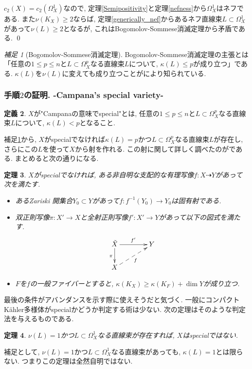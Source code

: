 \documentclass[12pt]{amsart}
\newtheorem{thm}{定理}[section]
\theoremstyle{definition}
\newtheorem{defn}[thm]{定義}
\theoremstyle{remark}
\newtheorem{rem}[thm]{補足}
\begin{document}
$c_2(X)=c_2(\Omega_{X}^1)$なので, 定理\ref{Semipositivity}と定理\ref{nefness}から$\Omega_{X}^{1}$はネフである.
また$\nu(K_X) \ge 2$ならば, 定理\ref{generically_nef}からあるネフ直線束$L \subset \Omega_{X}^{1}$があって$\nu(L)\ge 2$となるが, これはBogomolov-Sommese消滅定理から矛盾である.  \qed

\begin{rem}[Bogomolov-Sommese消滅定理]
\label{Bogomolov-Sommese}
Bogomolov-Sommese消滅定理の主張とは「任意の$1 \le p \le n$と$L \subset \Omega_{X}^{p}$なる直線束$L$について, $\kappa(L) \le p$が成り立つ」である. $\kappa(L)$を$\nu(L)$に変えても成り立つことが\cite{Mou98}により知られている.
\end{rem}

\subsubsection{手順$2$の証明. -Campana's special variety-}
\begin{defn}
$X$が"Campanaの意味でspecial"とは, 任意の$1 \le p \le n$と$L \subset \Omega_{X}^{p}$なる直線束$L$について, $\kappa(L) < p$となること.
\end{defn}
補足\ref{Bogomolov-Sommese}から, $X$がspecialでなければ$\kappa(L) =p$かつ$L \subset \Omega_{X}^{p}$なる直線束$L$が存在し, さらにこの$L$を使って$X$から射を作れる. この射に関して詳しく調べたのが\cite{Cam04}である. まとめると次の通りになる.
\begin{thm}\cite{Cam04}
\label{Campana_special}
$X$がspecialでなければ, ある非自明な支配的な有理写像$f : X \dashrightarrow Y$があって次を満たす.
\begin{itemize}
 \setlength{\parskip}{0cm} %
  \setlength{\itemsep}{0cm}
\item あるZariski 開集合$Y_0 \subset Y$があって$f: f^{-1}(Y_0) \rightarrow Y_0$は固有射である.
\item 双正則写像$\pi : X' \rightarrow X$と全射正則写像$f' : X' \rightarrow Y$があって以下の図式を満たす.
\begin{equation*}
\xymatrix@C=40pt@R=20pt{
 \tilde{X}\ar@{->}[d]_{\pi}   \ar@{->}[r]^{f'} & Y \\
X  \ar@{-->}[ur]_{f} &  \\
 }
\end{equation*}
 \item $F$を$f$の一般ファイバーとすると, $\kappa(K_X) \ge \kappa(K_F) + \dim Y$が成り立つ.
\end{itemize}
\end{thm}
最後の条件がアバンダンスを示す際に使えそうだと気づく. 一般にコンパクトK\"ahler多様体がspecialかどうか判定する術は少ない.
次の定理はそのような判定法を与えるものである.
\begin{thm}\cite{PRT21}
\label{numerically1}
$\nu(L) =1$かつ$L \subset \Omega_{X}^{1}$なる直線束が存在すれば, $X$はspecialではない.
\end{thm}
補足として, $\nu(L) =1$かつ$L \subset \Omega_{X}^{1}$なる直線束があっても, $\kappa(L)=1$とは限らない. つまりこの定理は全然自明ではない. 
\end{document}
